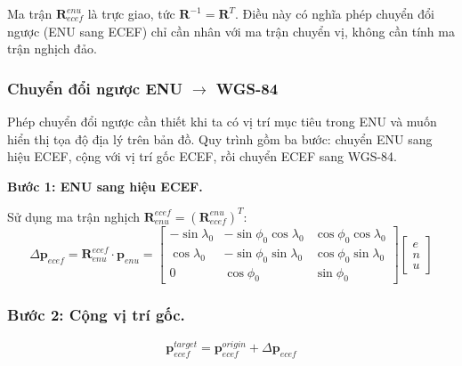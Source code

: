 Ma trận $\mathbf{R}_{ecef}^{enu}$ là trực giao, tức $\mathbf{R}^{-1} = \mathbf{R}^T$. Điều này có nghĩa phép chuyển đổi ngược (ENU sang ECEF) chỉ cần nhân với ma trận chuyển vị, không cần tính ma trận nghịch đảo.

\subsubsection{Chuyển đổi ngược ENU \texorpdfstring{$\rightarrow$}{sang} WGS-84}

\hspace{0.5cm} Phép chuyển đổi ngược cần thiết khi ta có vị trí mục tiêu trong ENU và muốn hiển thị tọa độ địa lý trên bản đồ. Quy trình gồm ba bước: chuyển ENU sang hiệu ECEF, cộng với vị trí gốc ECEF, rồi chuyển ECEF sang WGS-84.

\textbf{Bước 1: ENU sang hiệu ECEF.}

Sử dụng ma trận nghịch $\mathbf{R}_{enu}^{ecef} = (\mathbf{R}_{ecef}^{enu})^T$:
\begin{equation}
    \Delta\mathbf{p}_{ecef} = \mathbf{R}_{enu}^{ecef} \cdot \mathbf{p}_{enu} = \begin{bmatrix}
        -\sin\lambda_0 & -\sin\phi_0\cos\lambda_0 & \cos\phi_0\cos\lambda_0 \\
        \cos\lambda_0 & -\sin\phi_0\sin\lambda_0 & \cos\phi_0\sin\lambda_0 \\
        0 & \cos\phi_0 & \sin\phi_0
    \end{bmatrix} \begin{bmatrix} e \\ n \\ u \end{bmatrix}
\end{equation}

\subsubsection{Bước 2: Cộng vị trí gốc.\\}
\begin{equation}
    \mathbf{p}_{ecef}^{target} = \mathbf{p}_{ecef}^{origin} + \Delta\mathbf{p}_{ecef}
\end{equation}

